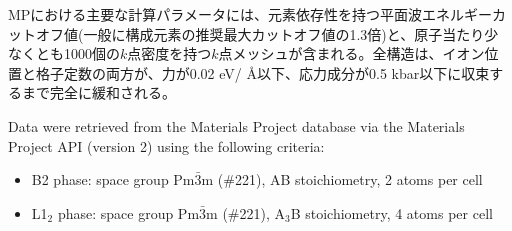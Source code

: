 \documentclass[a4paper,10pt,5p]{elsarticle}
\begin{document}
MPにおける主要な計算パラメータには、元素依存性を持つ平面波エネルギーカットオフ値(一般に構成元素の推奨最大カットオフ値の1.3倍)と、原子当たり少なくとも1000個の$k$点密度を持つ$k$点メッシュが含まれる。全構造は、イオン位置と格子定数の両方が、力が0.02 eV/ \AA 以下、応力成分が0.5 kbar以下に収束するまで完全に緩和される。






Data were retrieved from the Materials Project database via the Materials Project API (version 2) using the following criteria:
\begin{itemize}
\setlength{\parskip}{0cm}
\setlength{\itemsep}{0cm}
    \item B2 phase: space group Pm$\bar{3}$m (\#221), AB stoichiometry, 2 atoms per cell
    \item L1$_2$ phase: space group Pm$\bar{3}$m (\#221), A$_3$B stoichiometry, 4 atoms per cell
\end{itemize}
\end{document}
